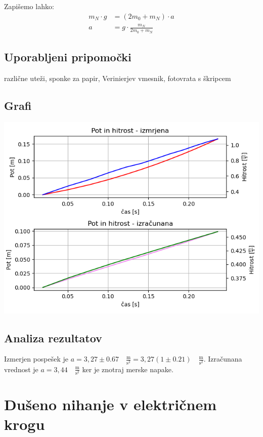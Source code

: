 \documentclass[12pt]{article}
\begin{document}
	Zapišemo lahko:
	\begin{equation}
		\begin{split}
			m_N \cdot g &= (2m_0 + m_N) \cdot a \\
			a &= g \cdot \frac{m_N}{2m_0 + m_N}
		\end{split}
	\end{equation}
	
	\subsection*{Uporabljeni pripomočki}
	različne uteži, sponke za papir, Verinierjev vmesnik, fotovrata s škripcem
	\subsection*{Grafi}
	\includegraphics[width=\linewidth]{slike/graf_v5_1.png}

	\subsection*{Analiza rezultatov}
	Izmerjen pospešek je $a = 3,27 \pm 0.67 \quad \frac{\text{m}}{\text{s}^2} = 3,27 (1 \pm 0.21)\quad \frac{\text{m}}{\text{s}^2}$.
	Izračunana vrednost je $ a = 3,44 \quad \frac{\text{m}}{\text{s}^2}$ ker je znotraj 
	merske napake.

\newpage
\section{Dušeno nihanje v električnem krogu}
\end{document}
